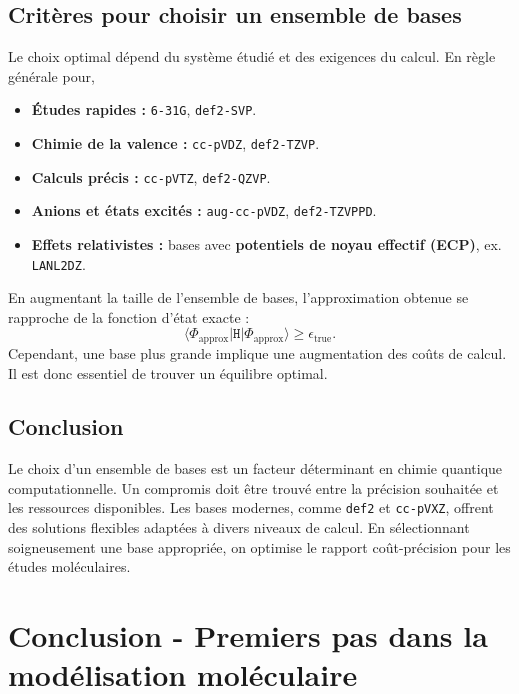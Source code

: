 \documentclass[12pt,a4paper]{article} %
\numberwithin{equation}{section} %
\numberwithin{figure}{section} %
\numberwithin{table}{section} %
\begin{document}
\subsection{Critères pour choisir un ensemble de bases}

Le choix optimal dépend du système étudié et des exigences du calcul. En règle générale pour,
\begin{itemize}
    \item \textbf{Études rapides :} \texttt{6-31G}, \texttt{def2-SVP}.
    \item \textbf{Chimie de la valence :} \texttt{cc-pVDZ}, \texttt{def2-TZVP}.
    \item \textbf{Calculs précis :} \texttt{cc-pVTZ}, \texttt{def2-QZVP}.
    \item \textbf{Anions et états excités :} \texttt{aug-cc-pVDZ}, \texttt{def2-TZVPPD}.
    \item \textbf{Effets relativistes :} bases avec \textbf{potentiels de noyau effectif (ECP)}, ex. \texttt{LANL2DZ}.
\end{itemize}

En augmentant la taille de l’ensemble de bases, l’approximation obtenue  se rapproche de la fonction d’état exacte :
\begin{equation}
\langle \Phi_{\text{approx}} | \mathtt{H} | \Phi_{\text{approx}} \rangle \geq  \epsilon_{\text{true}}.
\end{equation}
Cependant, une base plus grande implique une augmentation des coûts de calcul. Il est donc essentiel de trouver un équilibre optimal.

\subsection{Conclusion}

Le choix d’un ensemble de bases est un facteur déterminant en chimie quantique computationnelle. Un compromis doit être trouvé entre la précision souhaitée et les ressources disponibles. Les bases modernes, comme \texttt{def2} et \texttt{cc-pVXZ}, offrent des solutions flexibles adaptées à divers niveaux de calcul. En sélectionnant soigneusement une base appropriée, on optimise le rapport coût-précision pour les études moléculaires.

\section{Conclusion - Premiers pas dans la modélisation moléculaire}
\end{document}
